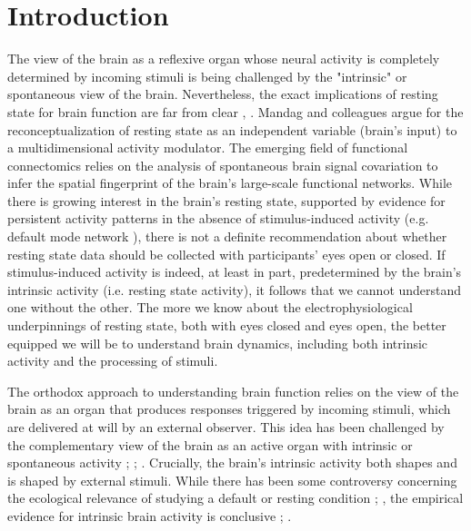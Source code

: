\documentclass[11pt, onecolumn]{article}
\begin{document}
\section{Introduction}
The view of the brain as a reflexive organ whose neural activity is completely determined by incoming stimuli is being challenged by the "intrinsic" or spontaneous view of the brain. Nevertheless, the exact implications of resting state for brain function are far from clear \citep{schneider2008resting}, \citep{northoff2010brain}. Mandag and colleagues \citep{maandag2007energetics} argue for the reconceptualization of resting state as an independent variable (brain’s input) to a multidimensional activity modulator. The emerging field of functional connectomics relies on the analysis of spontaneous brain signal covariation to infer the spatial fingerprint of the brain's large-scale functional networks. While there is growing interest in the brain's  resting state, supported by evidence for persistent activity patterns in the absence of stimulus-induced activity (e.g. default mode network \citep{greicius2004default}), there is not a definite recommendation about whether resting state data should be collected with participants' eyes open or closed. If stimulus-induced activity is indeed, at least in part, predetermined by the brain’s intrinsic activity (i.e. resting state activity), it follows that we cannot understand one without the other. The more we know about the electrophysiological underpinnings of resting state, both with eyes closed and eyes open, the better equipped we will be to understand brain dynamics, including both intrinsic activity and the processing of stimuli. 

The orthodox approach to understanding brain function relies on the view of the brain as an organ that produces responses triggered by incoming stimuli, which are delivered at will by an external observer. This idea has been challenged by the complementary view of the brain as an active organ with intrinsic or spontaneous activity \citep{llinas_intrinsic_1988}; \citep{biswal_functional_1995}; \citep{papo2013should}. Crucially, the brain's intrinsic activity both shapes and is shaped by external stimuli.
While there has been some controversy concerning the ecological relevance of studying a default or resting condition \citep{buckner2007unrest}; \citep{morcom2007does}, the empirical evidence for intrinsic brain activity is conclusive \citep{wang2006changes}; \citep{mantini2007electrophysiological}. 
\end{document}

